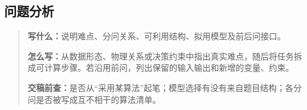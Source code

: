 \subsection{问题分析}
\begin{quote}\small
\noindent\textbf{\color{inkblue}写什么：}说明难点、分问关系、可利用结构、拟用模型及前后问接口。\par
\noindent\textbf{\color{inkblue}怎么写：}从数据形态、物理关系或决策约束中指出真实难点，随后将任务拆成可计算步骤。若沿用前问，列出保留的输入输出和新增的变量、约束。\par
\noindent\textbf{\color{inkblue}交稿前查：}是否从“采用某算法”起笔；模型选择有没有来自题目结构；各分问是否被写成互不相干的算法清单。
\end{quote}

